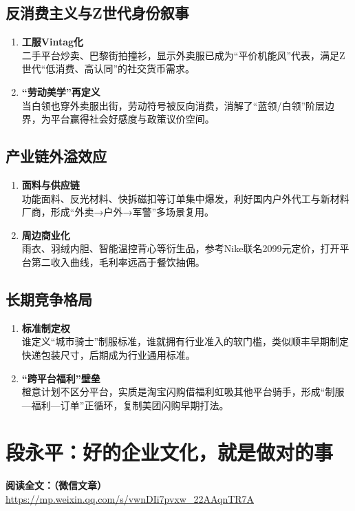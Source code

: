 \subsection{反消费主义与Z世代身份叙事}
\begin{enumerate}[leftmargin=*, nosep]
    \item \textbf{工服Vintag化}  \\
    二手平台炒卖、巴黎街拍撞衫，显示外卖服已成为“平价机能风”代表，满足Z世代“低消费、高认同”的社交货币需求。
    \item \textbf{“劳动美学”再定义}  \\
    {\color{blue}当白领也穿外卖服出街，劳动符号被反向消费，消解了“蓝领/白领”阶层边界，为平台赢得社会好感度与政策议价空间。}
\end{enumerate}

\subsection{产业链外溢效应}
\begin{enumerate}[leftmargin=*, nosep]
    \item \textbf{面料与供应链}  \\
    功能面料、反光材料、快拆磁扣等订单集中爆发，利好国内户外代工与新材料厂商，形成“外卖→户外→军警”多场景复用。
    \item \textbf{周边商业化}  \\
    雨衣、羽绒内胆、智能温控背心等衍生品，参考Nike联名2099元定价，打开平台第二收入曲线，毛利率远高于餐饮抽佣。
\end{enumerate}

\subsection{长期竞争格局}
\begin{enumerate}[leftmargin=*, nosep]
    \item \textbf{标准制定权}  \\
    谁定义“城市骑士”制服标准，谁就拥有行业准入的软门槛，类似顺丰早期制定快递包装尺寸，后期成为行业通用标准。
    \item \textbf{“跨平台福利”壁垒}  \\
    橙意计划不区分平台，实质是淘宝闪购借福利虹吸其他平台骑手，形成“制服—福利—订单”正循环，复制美团闪购早期打法。
\end{enumerate}

\clearpage

\section{段永平：好的企业文化，就是做对的事}
\vspace{1cm}
\noindent\textbf{阅读全文：（微信文章）} \url{https://mp.weixin.qq.com/s/vwnDIi7pvxw_22AAqnTR7A}

